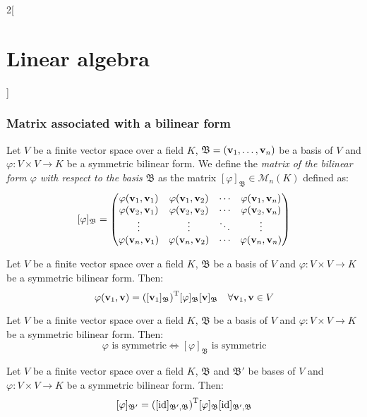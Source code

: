 \documentclass[../../../main.tex]{subfiles}
\begin{document}
\begin{multicols}{2}[\section{Linear algebra}]
  \subsubsection*{Matrix associated with a bilinear form}
  \begin{definition}
    Let $V$ be a finite vector space over a field $K$, $\mathfrak{B}=(\vb{v}_1,\ldots,\vb{v}_n)$ be a basis of $V$ and $\varphi:V\times V\rightarrow K$ be a symmetric bilinear form. We define the \textit{matrix of the bilinear form $\varphi$ with respect to the basis $\mathfrak{B}$} as the matrix $[\varphi]_\mathfrak{B}\in\mathcal{M}_n(K)$ defined as: $$[\varphi]_\mathfrak{B}=
      \begin{pmatrix}
        \varphi(\vb{v}_1,\vb{v}_1) & \varphi(\vb{v}_1,\vb{v}_2) & \cdots & \varphi(\vb{v}_1,\vb{v}_n) \\
        \varphi(\vb{v}_2,\vb{v}_1) & \varphi(\vb{v}_2,\vb{v}_2) & \cdots & \varphi(\vb{v}_2,\vb{v}_n) \\
        \vdots                                   & \vdots                                   & \ddots & \vdots                                   \\
        \varphi(\vb{v}_n,\vb{v}_1) & \varphi(\vb{v}_n,\vb{v}_2) & \cdots & \varphi(\vb{v}_n,\vb{v}_n) \\
      \end{pmatrix}$$
  \end{definition}
  \begin{lemma}
    Let $V$ be a finite vector space over a field $K$, $\mathfrak{B}$ be a basis of $V$ and $\varphi:V\times V\rightarrow K$ be a symmetric bilinear form. Then:
    $$\varphi(\vb{v}_1,\vb{v})={\left([\vb{v}_1]_\mathfrak{B}\right)}^\mathrm{T}[\varphi]_\mathfrak{B}[\vb{v}]_\mathfrak{B}\quad\forall\vb{v}_1,\vb{v}\in V$$
  \end{lemma}
  \begin{prop}
    Let $V$ be a finite vector space over a field $K$, $\mathfrak{B}$ be a basis of $V$ and $\varphi:V\times V\rightarrow K$ be a symmetric bilinear form. Then: $$\varphi\text{ is symmetric}\iff[\varphi]_\mathfrak{B}\text{ is symmetric}$$
  \end{prop}
  \begin{prop}
    Let $V$ be a finite vector space over a field $K$, $\mathfrak{B}$ and $\mathfrak{B}'$ be bases of $V$ and $\varphi:V\times V\rightarrow K$ be a symmetric bilinear form. Then: $$[\varphi]_{\mathfrak{B}'}={([\mathrm{id}]_{\mathfrak{B}',\mathfrak{B}})}^\mathrm{T}[\varphi]_\mathfrak{B}[\mathrm{id}]_{\mathfrak{B}',\mathfrak{B}}$$
  \end{prop}

\end{multicols}
\end{document}
